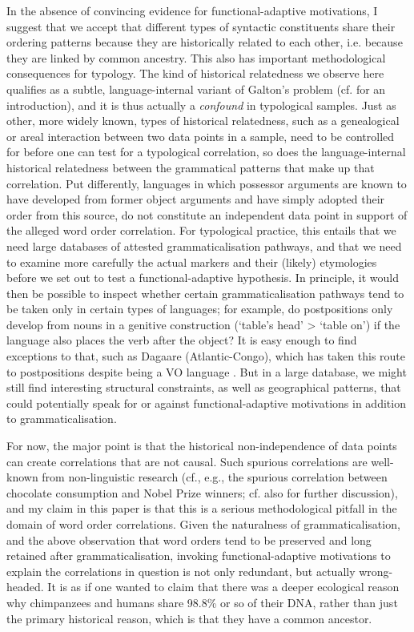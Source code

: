 \documentclass[output=paper]{langsci/langscibook}
\begin{document}
In the absence of convincing evidence for functional-adaptive motivations, I suggest that we accept that different types of syntactic constituents share their ordering patterns because they are historically related to each other, i.e. because they are linked by common ancestry. This also has important methodological consequences for typology. The kind of historical relatedness we observe here \label{pg:collins:dependency}qualifies as a subtle, language-internal variant of Galton’s problem (cf. \citealt{Cysouw2011} for an introduction), and it is thus actually a \textit{confound} in typological samples. Just as other, more widely known, types of historical relatedness, such as a genealogical or areal interaction between two data points in a sample, need to be controlled for before one can test for a typological correlation, so does the language-internal historical relatedness between the grammatical patterns that make up that correlation. Put differently, languages in which possessor arguments are known to have developed from former object arguments and have simply adopted their order from this source, do not constitute an independent data point in support of the alleged word order correlation. For typological practice, this entails that we need large databases
\label{pg:collins:refforhaspelmath}of attested grammaticalisation pathways, and that we need to examine more carefully the actual markers and their (likely) etymologies before we set out to test a functional-adaptive hypothesis. In principle, it would then be possible to inspect whether certain grammaticalisation pathways tend to be taken only in certain types of languages; for example, do postpositions only develop from nouns in a genitive construction (‘table's head’ > ‘table on’) if the language also places the verb after the object? It is easy enough to find exceptions to that, such as Dagaare (Atlantic-Congo), which has taken this route to postpositions despite being a VO language \citep{Bodomo1997}. But in a large database, we might still find interesting structural constraints, as well as geographical patterns, that could potentially speak for or against functional-adaptive motivations in addition to grammaticalisation. 

For now, the major point is that the historical non-independence of data points can create correlations that are not causal. Such spurious correlations are well-known from non-linguistic research (cf., e.g., the spurious correlation between chocolate consumption and Nobel Prize winners; cf. also \citealt{RobertsWinters2013} for further discussion), and my claim in this paper is that this is a serious methodological pitfall in the domain of word order correlations. Given the naturalness of grammaticalisation, and the above observation that word orders tend to be preserved and long retained after grammaticalisation, invoking functional-adaptive motivations to explain the correlations in question is not only redundant, but actually wrong-headed. It is as if one wanted to claim that there was a deeper ecological reason why chimpanzees and humans share 98.8\% or so of their DNA, rather than just the primary historical reason, which is that they have a common ancestor.
\end{document}
